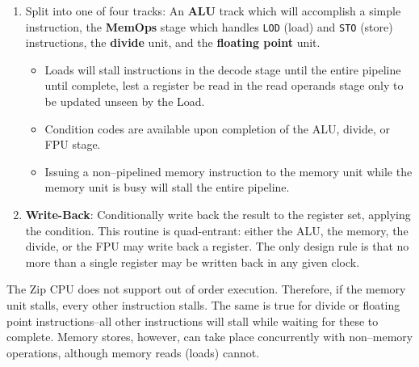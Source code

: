 \documentclass{gqtekspec}
\begin{document}
\begin{enumerate}
\item Split into one of four tracks: An {\bf ALU} track which will accomplish
	a simple instruction, the {\bf MemOps} stage which handles {\tt LOD}
	(load) and {\tt STO} (store) instructions, the {\bf divide} unit,
	and the {\bf floating point} unit.
	\begin{itemize}
	\item Loads will stall instructions in the decode stage until the
		entire pipeline until complete, lest a register be read in
		the read operands stage only to be updated unseen by the
		Load.
	\item Condition codes are available upon completion of the ALU,
		divide, or FPU stage.
	\item Issuing a non--pipelined memory instruction to the memory unit
		while the memory unit is busy will stall the entire pipeline. 
	\end{itemize}
\item {\bf Write-Back}: Conditionally write back the result to the register
	set, applying the condition.  This routine is quad-entrant: either the
	ALU, the memory, the divide, or the FPU may write back a register.
	The only design rule is that no more than a single register may be
	written back in any given clock.
\end{enumerate}

The Zip CPU does not support out of order execution.  Therefore, if the memory
unit stalls, every other instruction stalls.  The same is true for divide or
floating point instructions--all other instructions will stall while waiting
for these to complete.  Memory stores, however, can take place concurrently
with non--memory operations, although memory reads (loads) cannot.
\end{document}
